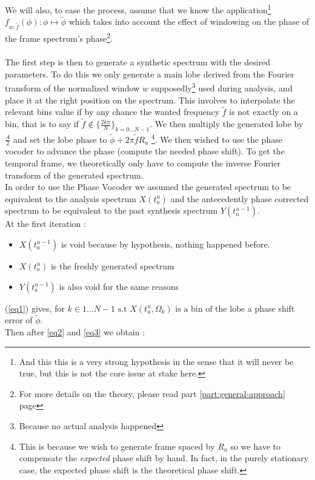 \documentclass[]{article}
\begin{document}
We will also, to ease the process, assume that we know the application\footnote{And this this is a very strong hypothesis in the sense that it will never be true, but this is not the core issue at stake here.} ${f_{w, \tilde{f}}(\phi) : \phi \mapsto \tilde{\phi}}$ which takes into account the effect of windowing on the phase of the frame spectrum's phase\footnote{For more details on the theory, please read part \ref{part:general-approach} page \pageref{part:general-approach}}.\\ \\
The first step is then to generate a synthetic spectrum with the desired parameters. To do this we only generate a main lobe derived from the Fourier transform of the normalized window $w$ supposedly\footnote{Because no actual analysis happened} used during analysis, and place it at the right position on the spectrum. This involves to interpolate the relevant bins value if by any chance the wanted frequency $\tilde{f}$ is not exactly on a bin, that is to say if $\tilde{f} \notin \{\frac{2 k \pi}{N} \}_{k=0...N-1}$. We then multiply the generated lobe by $\frac{A}{2}$ and set the lobe phase to $\tilde{\phi} + 2\pi \tilde{f} R_a$    \footnote{This is because we wish to generate frame spaced by $R_a$ so we have to compensate the \emph{expected} phase shift by hand. In fact, in the purely stationary case, the expected phase shift is the theoretical phase shift.}. We then wished to use the phase vocoder to advance the phase (compute the needed phase shift). To get the temporal frame, we theoretically only have to compute the inverse Fourier transform of the generated spectrum.\\
In order to use the Phase Vocoder we assumed the generated spectrum to be equivalent to the analysis spectrum $X(t_a^u)$ and the antecedently phase corrected spectrum to be equivalent to the past synthesis spectrum $Y(t_a^{u-1})$.\\
At the first iteration :
\begin{itemize}
	\item $X(t_a^{u-1})$ is void because by hypothesis, nothing happened before.
	\item $X(t_a^u)$ is the freshly generated spectrum
	\item $Y(t_a^{u-1})$ is also void for the same reasons
\end{itemize}
(\ref{eq1}) gives, for $k \in {1...N-1} \text{ s.t } X(t_a^{u}, \Omega_k) \text{ is a bin of the lobe}$ a phase shift error of $\tilde{\phi}$.\\
Then after \ref{eq2} and \ref{eq3} we obtain :
\end{document}
